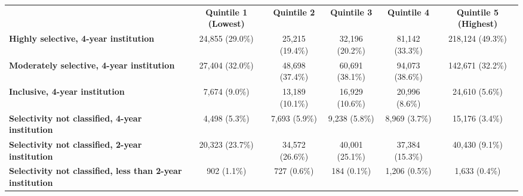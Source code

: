 \begin{tabular*}{\textwidth}{@{\extracolsep{\fill} } lccccc}%
&\multirow{2}{0.5in}{\bfseries\centering Quintile 1 (Lowest)}&\multirow{2}{0.5in}{\bfseries Quintile 2}&\multirow{2}{0.5in}{\bfseries Quintile 3}&\multirow{2}{0.5in}{\bfseries Quintile 4}&\multirow{2}{0.5in}{\bfseries\centering Quintile 5 (Highest)}\\%
&&&&&\\%
\hline%
\textbf{Highly selective, 4-year institution}&24,855 (29.0\%)&25,215 (19.4\%)&32,196 (20.2\%)&81,142 (33.3\%)&218,124 (49.3\%)\\%
\textbf{Moderately selective, 4-year institution}&27,404 (32.0\%)&48,698 (37.4\%)&60,691 (38.1\%)&94,073 (38.6\%)&142,671 (32.2\%)\\%
\textbf{Inclusive, 4-year institution}&7,674 (9.0\%)&13,189 (10.1\%)&16,929 (10.6\%)&20,996 (8.6\%)&24,610 (5.6\%)\\%
\textbf{Selectivity not classified, 4-year institution}&4,498 (5.3\%)&7,693 (5.9\%)&9,238 (5.8\%)&8,969 (3.7\%)&15,176 (3.4\%)\\%
\textbf{Selectivity not classified, 2-year institution}&20,323 (23.7\%)&34,572 (26.6\%)&40,001 (25.1\%)&37,384 (15.3\%)&40,430 (9.1\%)\\%
\textbf{Selectivity not classified, less than 2-year institution}&902 (1.1\%)&727 (0.6\%)&184 (0.1\%)&1,206 (0.5\%)&1,633 (0.4\%)\\%
\hline%
\end{tabular*}